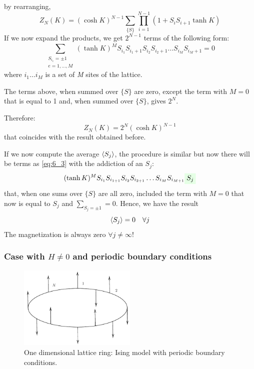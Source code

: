 \documentclass[../../Main/Main.tex]{subfiles}
\begin{document}
by rearranging,
\begin{equation}
  Z_N (K)= (\cosh K)^{N-1} \sum_{\{S\}}^{}  \prod_{i=1}^{N-1} ( 1 + S_i S_{i+1} \tanh K )
\end{equation}
If we now expand the products, we get \( 2^{N-1} \) terms of the following form:
\begin{equation}
  \sum_{ \substack{ S_{i_e} = \pm 1\\ e= 1, \dots, M} }^{}  (\tanh K )^M S_{i_1} S_{i_{1}+1} S_{i_2} S_{i_{2}+1} \dots S_{i_M} S_{i_{M}+1} = 0
  \label{eq:6_3}
\end{equation}
where \( i_1 \dots i_M \) is a set of \emph{M} sites of the lattice.
\begin{remark}
The terms above, when summed over \( \{ S \}   \) are zero, except the term with \( M=0 \) that is equal to 1 and, when summed over \( \{ S \}   \), gives \( 2^N \).
\end{remark}
Therefore:
\begin{equation*}
  Z_N (K) = 2^N (\cosh K)^{N-1}
\end{equation*}
that coincides with the result obtained before.

 If we now compute the average \( \expval{S_j}  \), the procedure is similar but now there will be terms as \eqref{eq:6_3} with the addiction of an \( S_j \):
\begin{equation}
  (\tanh K)^M S_{i_1} S_{i_{1+1}} S_{i_2} S_{i_{2+1}} \dots S_{i_M} S_{i_{M+1}} \mathcolorbox{green!10}{S_j}
\end{equation}
that, when one sums over \( \{ S \}   \) are all zero, included the term with \( M=0 \) that now is equal to \( S_j \) and \( \sum_{S_j = \pm 1}^{} = 0   \). Hence, we have the result
\begin{equation}
  \expval{S_j} = 0 \quad \forall j
\end{equation}
The magnetization is always zero \( \forall j \neq \infty  \)!


\subsubsection{Case with \( H\neq0 \) and periodic boundary conditions}

\begin{figure}[H]
\centering
\includegraphics[width=0.5\textwidth]{./img/4__1.pdf}
\caption{\label{fig:6_4} One dimensional lattice ring: Ising model with periodic boundary conditions.}
\end{figure}
\end{document}
